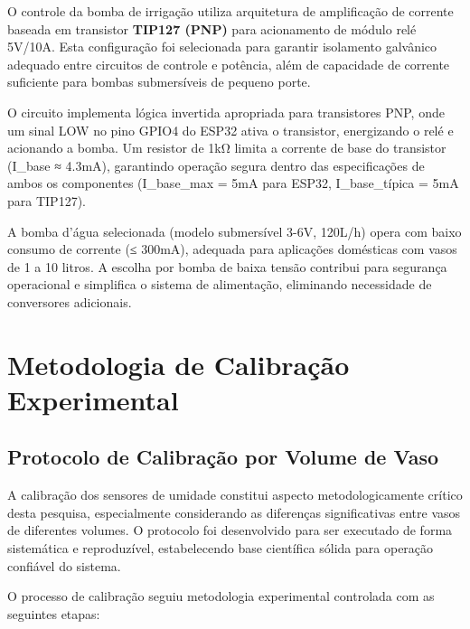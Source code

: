 O controle da bomba de irrigação utiliza arquitetura de amplificação de corrente baseada em transistor \textbf{TIP127 (PNP)} para acionamento de módulo relé 5V/10A. Esta configuração foi selecionada para garantir isolamento galvânico adequado entre circuitos de controle e potência, além de capacidade de corrente suficiente para bombas submersíveis de pequeno porte.


O circuito implementa lógica invertida apropriada para transistores PNP, onde um sinal LOW no pino GPIO4 do ESP32 ativa o transistor, energizando o relé e acionando a bomba. Um resistor de 1kΩ limita a corrente de base do transistor (I_base ≈ 4.3mA), garantindo operação segura dentro das especificações de ambos os componentes (I_base_max = 5mA para ESP32, I_base_típica = 5mA para TIP127).

A bomba d'água selecionada (modelo submersível 3-6V, 120L/h) opera com baixo consumo de corrente (≤ 300mA), adequada para aplicações domésticas com vasos de 1 a 10 litros. A escolha por bomba de baixa tensão contribui para segurança operacional e simplifica o sistema de alimentação, eliminando necessidade de conversores adicionais.

\section{Metodologia de Calibração Experimental}

\subsection{Protocolo de Calibração por Volume de Vaso}

A calibração dos sensores de umidade constitui aspecto metodologicamente crítico desta pesquisa, especialmente considerando as diferenças significativas entre vasos de diferentes volumes. O protocolo foi desenvolvido para ser executado de forma sistemática e reproduzível, estabelecendo base científica sólida para operação confiável do sistema.

O processo de calibração seguiu metodologia experimental controlada com as seguintes etapas:

